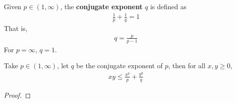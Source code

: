 \documentclass[11pt]{article}
\begin{document}
	\begin{definition}
		Given $p \in (1, \infty)$, the \textbf{conjugate exponent} $q$ is defined as
		\begin{align}
			\frac{1}{p} + \frac{1}{q} = 1
		\end{align}
		That is,
		\begin{align}
			q = \frac{p}{p-1}
		\end{align}
		For $p = \infty$, $q=1$.
	\end{definition}
	
	\begin{lemma}
		Take $p \in (1, \infty)$, let $q$ be the conjugate exponent of $p$, then for all $x, y \geq 0$,
		\begin{align}
			x y \leq \frac{x^p}{p} + \frac{y^q}{q}
		\end{align}
		\begin{proof}
			
		\end{proof}
	\end{lemma}
	
\end{document}
